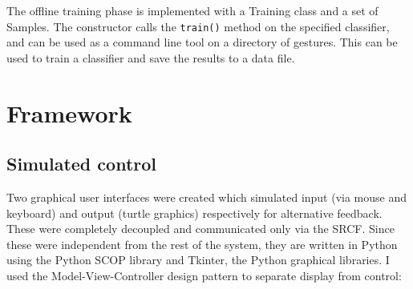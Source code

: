 \documentclass[12pt,a4,notitlepage]{report}
\renewcommand{\_}{\texttt{\symbol{95}}}
\newcommand{\<}{\texttt{\symbol{60}}}
\renewcommand{\>}{\texttt{\symbol{62}}}
\newcommand{\variable}[1]{\texttt{#1}}
\begin{document}
The offline training phase is implemented with a Training class and a set of Samples. The constructor calls the \variable{train()} method on the specified classifier, and can be used as a command line tool on a directory of gestures. This can be used to train a classifier and save the results to a data file.

\section{Framework}

\subsection{Simulated control}

Two graphical user interfaces were created which simulated input (via mouse and keyboard) and output (turtle graphics) respectively for alternative feedback. These were completely decoupled and communicated only via the SRCF. Since these were independent from the rest of the system, they are written in Python using the Python SCOP library and Tkinter, the Python graphical libraries. I used the Model-View-Controller design pattern to separate display from control:
\end{document}
